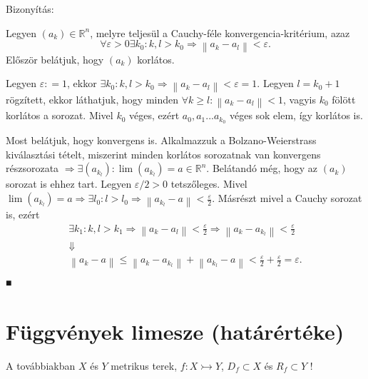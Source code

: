 \documentclass[12pt,a4paper]{scrartcl}
\newenvironment{bizonyitas}{}{}
\begin{document}
\begin{bizonyitas}

Bizonyítás:

Legyen \(\left( a_{k} \right) \in {\mathbb{R}}^{n}\), melyre teljesül a
Cauchy-féle konvergencia-kritérium, azaz
\[\left. \forall\varepsilon > 0\exists k_{0}:k,l > k_{0}\Rightarrow\left\| {a_{k} - a_{l}} \right\| < \varepsilon. \right.\]
Először belátjuk, hogy \(\left( a_{k} \right)\) korlátos.

Legyen \(\varepsilon: = 1\), ekkor
\(\left. \exists k_{0}:k,l > k_{0}\Rightarrow\left\| {a_{k} - a_{l}} \right\| < \varepsilon = 1 \right.\).
Legyen \(l = k_{0} + 1\) rögzített, ekkor láthatjuk, hogy minden
\(\forall k \geq l:\left\| {a_{k} - a_{l}} \right\| < 1\), vagyis
\(k_{0}\) fölött korlátos a sorozat. Mivel \(k_{0}\) véges, ezért
\(a_{0},a_{1}...a_{k_{0}}\) véges sok elem, így korlátos is.

Most belátjuk, hogy konvergens is. Alkalmazzuk a Bolzano-Weierstrass
kiválasztási tételt, miszerint minden korlátos sorozatnak van konvergens
részsorozata
\(\left. \Rightarrow\exists\left( a_{k_{l}} \right):\lim\left( a_{k_{l}} \right) = a \in {\mathbb{R}}^{n} \right.\).
Belátandó még, hogy az \(\left( a_{k} \right)\) sorozat is ehhez tart.
Legyen \(\varepsilon/2 > 0\) tetszőleges. Mivel
\(\left. \lim\left( a_{k_{l}} \right) = a\Rightarrow\exists l_{0}:l > l_{0}\Rightarrow\left\| {a_{k_{l}} - a} \right\| < \frac{\varepsilon}{2} \right.\).
Másrészt mivel a Cauchy sorozat is, ezért \[\begin{matrix}
\left. \exists k_{1}:k,l > k_{1}\Rightarrow\left\| {a_{k} - a_{l}} \right\| < \frac{\varepsilon}{2}\Rightarrow\left\| {a_{k} - a_{k_{l}}} \right\| < \frac{\varepsilon}{2} \right. \\
 \Downarrow \\
{\left\| {a_{k} - a} \right\| \leq \left\| {a_{k} - a_{k_{l}}} \right\| + \left\| {a_{k_{l}} - a} \right\| < \frac{\varepsilon}{2} + \frac{\varepsilon}{2} = \varepsilon.} \\
\end{matrix}\] ■

\end{bizonyitas}

\hypertarget{fuggvenyek-limesze-hatarerteke}{%
\section{Függvények limesze
(határértéke)}\label{fuggvenyek-limesze-hatarerteke}}

A továbbiakban \(X\) és \(Y\) metrikus terek,
\(\left. f:X\rightarrowtail Y \right.\), \(D_{f} \subset X\) és
\(R_{f} \subset Y\) !
\end{document}
